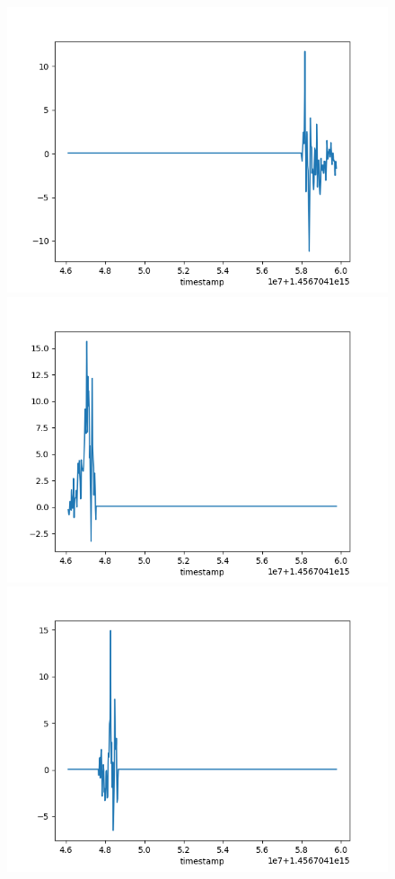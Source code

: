 \documentclass{beamer}
\begin{document}
\begin{frame}
\begin{figure}
	\includegraphics[scale=.15]{point_1}
    \includegraphics[scale=.15]{point_2}
    \includegraphics[scale=.15]{point_3}

\end{figure}
\end{frame}
\end{document}
